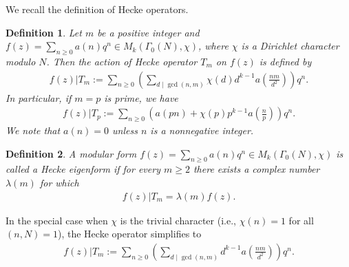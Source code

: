 \documentclass[12pt,reqno]{amsart}
\numberwithin{equation}{section}
\newtheorem{definition}{Definition}[section]
\begin{document}
We recall the definition of Hecke operators.
\begin{definition}
Let $m$ be a positive integer and $f(z) = \sum_{n \geq 0} a(n)q^n \in M_{k}(\Gamma_0(N),\chi)$, where $\chi$ is a Dirichlet character modulo $N$. Then the action of Hecke operator $T_m$ on $f(z)$ is defined by 
\begin{align*}
f(z)|T_m := \sum_{n \geq 0} \left(\sum_{d\mid \gcd(n,m)}\chi(d)d^{k-1}a\left(\frac{nm}{d^2}\right)\right)q^n.
\end{align*}
In particular, if $m=p$ is prime, we have 
\begin{align}\label{hecke}
f(z)|T_p := \sum_{n \geq 0} \left(a(pn)+\chi(p)p^{k-1}a\left(\frac{n}{p}\right)\right)q^n.
\end{align}
We note that $a(n)=0$ unless $n$ is a nonnegative integer.
\end{definition}
\begin{definition}\label{hecke2}
	A modular form $f(z)=\sum_{n \geq 0}a(n)q^n \in M_{k}(\Gamma_0(N),\chi)$ is called a Hecke eigenform if for every $m\geq2$ there exists a complex number $\lambda(m)$ for which 
	\begin{align}\label{hecke3}
	f(z)|T_m = \lambda(m)f(z).
	\end{align}
\end{definition}

In the special case when $\chi$ is the trivial character (i.e., $\chi(n) = 1$ for all $(n,N) = 1$), the Hecke operator simplifies to
\begin{align*}
f(z)|T_m := \sum_{n \geq 0} \left(\sum_{d\mid \gcd(n,m)}d^{k-1}a\left(\frac{nm}{d^2}\right)\right)q^n.
\end{align*}
\end{document}

